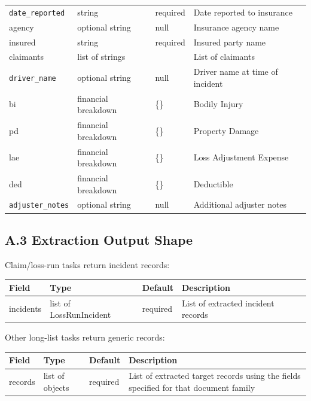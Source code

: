 \begin{longtable}{@{}>{\raggedright\arraybackslash}p{} >{\raggedright\arraybackslash}p{} >{\raggedright\arraybackslash}p{} >{\raggedright\arraybackslash}p{}@{}}
\texttt{date\_\allowbreak reported} & string & required & Date reported to insurance \\
agency & optional string & null & Insurance agency name \\
insured & string & required & Insured party name \\
claimants & list of strings & [] & List of claimants \\
\texttt{driver\_\allowbreak name} & optional string & null & Driver name at time of incident \\
bi & financial breakdown & \{\} & Bodily Injury \\
pd & financial breakdown & \{\} & Property Damage \\
lae & financial breakdown & \{\} & Loss Adjustment Expense \\
ded & financial breakdown & \{\} & Deductible \\
\texttt{adjuster\_\allowbreak notes} & optional string & null & Additional adjuster notes \\
\end{longtable}
\endgroup

\subsection*{A.3 Extraction Output Shape}

Claim/loss-run tasks return incident records:

\begingroup
\small
\setlength{\tabcolsep}{3pt}
\renewcommand{\arraystretch}{1.15}
\begin{tabular}{@{}>{\raggedright\arraybackslash}p{} >{\raggedright\arraybackslash}p{} >{\raggedright\arraybackslash}p{} >{\raggedright\arraybackslash}p{}@{}}
\toprule
Field & Type & Default & Description \\
\midrule
incidents & list of LossRunIncident & required & List of extracted incident records \\
\bottomrule
\end{tabular}
\endgroup

\vspace{0.9em}
\noindent Other long-list tasks return generic records:

\vspace{0.3em}
\begingroup
\small
\setlength{\tabcolsep}{3pt}
\renewcommand{\arraystretch}{1.15}
\begin{tabular}{@{}>{\raggedright\arraybackslash}p{} >{\raggedright\arraybackslash}p{} >{\raggedright\arraybackslash}p{} >{\raggedright\arraybackslash}p{}@{}}
\toprule
Field & Type & Default & Description \\
\midrule
records & list of objects & required & List of extracted target records using the fields specified for that document family \\
\bottomrule
\end{tabular}
\endgroup

